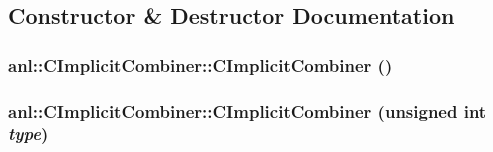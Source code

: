 \subsection{Constructor \& Destructor Documentation}
\hypertarget{classanl_1_1CImplicitCombiner_a7818797a1a47a913afe578efce883376}{
\subsubsection[{CImplicitCombiner}]{\setlength{\rightskip}{0pt plus 5cm}anl::CImplicitCombiner::CImplicitCombiner ()}}
\label{classanl_1_1CImplicitCombiner_a7818797a1a47a913afe578efce883376}
\hypertarget{classanl_1_1CImplicitCombiner_aa0bd0fa516387b46efb5f8642ce3ef8f}{
\subsubsection[{CImplicitCombiner}]{\setlength{\rightskip}{0pt plus 5cm}anl::CImplicitCombiner::CImplicitCombiner (unsigned int {\em type})}}
\label{classanl_1_1CImplicitCombiner_aa0bd0fa516387b46efb5f8642ce3ef8f}


